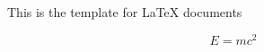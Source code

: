 \documentclass{article}
\begin{document}
This is the template for LaTeX documents

\[
E = mc^2
\]
\end{document}
